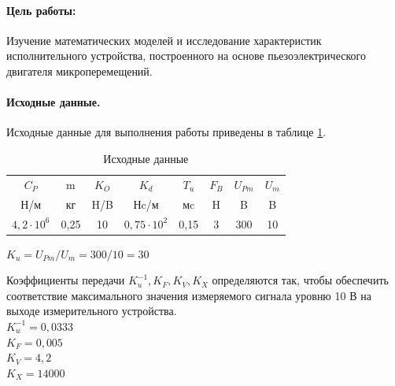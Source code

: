 \documentclass[a4paper,12pt]{article} %
\begin{document}

\setcounter{page}{2}

\paragraph{Цель работы:}Изучение математических моделей и исследование характеристик исполнительного устройства, построенного на основе пьезоэлектрического двигателя микроперемещений.
\paragraph{Исходные данные.}

Исходные данные для выполнения работы приведены в таблице \ref{Tab1}.
\begin{table}[h!]
	\renewcommand{\arraystretch}{1.3} %
	\renewcommand{\tabcolsep}{0.3cm} %
	\centering
	\begin{threeparttable}
    \caption{Исходные данные}
    \begin{tabular}{|c|c|c|c|c|c|c|c|}
    \hline $C_P$ & m & $K_O$ & $K_d$ & $T_u$ & $F_B$ & $U_{Pm}$ & $U_m$\\
    Н/м & кг & H/B & Нc/м & мc & H & B & B\\
    \hline $4,2\cdot10^6$ & 0,25 & 10 & $0,75\cdot10^2$ & 0,15 & 3 & 300 & 10\\
    \hline
    \end{tabular} 
    \label{Tab1}
    \end{threeparttable}
\end{table}

$K_u=U_{Pm}/U_m=300/10=30$
\par
Коэффициенты передачи $K_u^{-1}, K_F, K_V, K_X$ определяются так, чтобы обеспечить соответствие максимального значения измеряемого сигнала уровню 10 В на выходе измерительного устройства.\\ 
$K_u^{-1} = 0,0333$\\
$K_F = 0,005$\\
$K_V = 4,2$\\
$K_X = 14000$

\newpage
\end{document}
